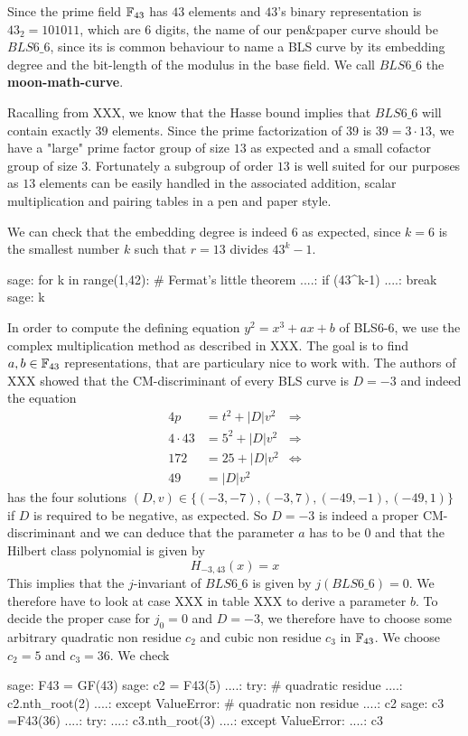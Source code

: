 Since the prime field $\mathbb{F}_{43}$ has $43$ elements and $43$'s binary representation is $43_2= 101011$, which are $6$ digits, the name of our pen\&{}paper curve should be $BLS6\_6$, since its is common behaviour to name a BLS curve by its embedding degree and the bit-length of the modulus in the base field. We call $BLS6\_6$ the \textbf{moon-math-curve}.

Racalling from XXX, we know that the Hasse bound implies that $BLS6\_6$ will contain exactly $39$ elements. Since the prime factorization of $39$ is $39=3\cdot 13$, we have a "large" prime factor group of size $13$ as expected and a small cofactor group of size $3$. Fortunately a subgroup of order $13$ is well suited for our purposes as $13$ elements can be easily handled in the associated addition, scalar multiplication and pairing tables in a pen and paper style. 

We can check that the embedding degree is indeed $6$ as expected, since $k = 6$ is the smallest number $k$ such that $r=13$ divides $43^k-1$. 
\begin{sagecommandline}
sage: for k in range(1,42): # Fermat's little theorem
....:     if (43^k-1)%
....:         break
sage: k
\end{sagecommandline}
In order to compute the defining equation $y^2=x^3 + ax + b$ of BLS6-6, we use the complex multiplication method as described in XXX. The goal is to find $a,b\in\mathbb{F}_{43}$ representations, that are particulary nice to work with. The authors of XXX showed that the CM-discriminant of every BLS curve is $D=-3$ and indeed the equation
\begin{align*}
4p & = t^2 + |D|v^2 & \Rightarrow \\ 
4\cdot 43 & = 5^2 + |D|v^2 & \Rightarrow \\ 
172 & = 25 + |D| v^2 & \Leftrightarrow \\ 
49 & = |D| v^2
\end{align*}
has the four solutions $(D,v)\in\{(-3,-7),(-3,7),(-49,-1),(-49,1)\}$ if $D$ is required to be negative, as expected. So $D=-3$ is indeed a proper CM-discriminant and we can deduce that the parameter $a$ has to be $0$ and that the Hilbert class polynomial is given by
$$
H_{-3,43}(x) = x
$$
This implies that the $j$-invariant of $BLS6\_6$ is given by $j(BLS6\_6)=0$. We therefore have to look at case XXX in table XXX to derive a parameter $b$. To decide the proper case for $j_0=0$ and $D=-3$, we therefore have to choose some arbitrary quadratic non residue $c_2$ and cubic non residue $c_3$ in $\mathbb{F}_{43}$. We choose $c_2 =5$ and $c_3=36$. We check
\begin{sagecommandline}
sage: F43 = GF(43)
sage: c2 = F43(5)
....: try: # quadratic residue
....:     c2.nth_root(2)
....: except ValueError: # quadratic non residue
....:     c2
sage: c3 =F43(36)
....: try:
....:     c3.nth_root(3)
....: except ValueError:
....:     c3
\end{sagecommandline} 

